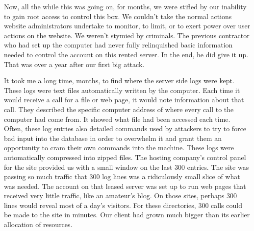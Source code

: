 Now, all the while this was going on, for months, we were stifled by our inability to gain root access to control this box.  We couldn't take the normal actions website administrators undertake to monitor, to limit, or to exert power over user actions on the website.  We weren't stymied by criminals.  The previous contractor who had set up the computer had never fully relinquished basic information needed to control the account on this rented server.  In the end, he did give it up.  That was over a year after our first big \gls{attack}.

It took me a long time, months, to find where the server side logs were kept.  These logs were text files automatically written by the computer.  Each time it would receive a call for a file or web page, it would note information about that call.  They described the specific computer address of where every call to the computer had come from.  It showed what file had been accessed each time.  Often, these log entries also detailed commands used by attackers to try to force bad input into the database in order to overwhelm it and grant them an opportunity to cram their own commands into the machine.  These logs were automatically compressed into zipped files.  The hosting company's control panel for the site provided us with a small window on the last 300 entries.  The site was passing so much traffic that 300 log lines was a ridiculously small slice of what was needed.  The account on that leased server was set up to run web pages that received very little traffic, like an amateur's blog.  On those sites, perhaps 300 lines would reveal most of a day's visitors.  For these directories, 300 calls could be made to the site in minutes.  Our client had grown much bigger than its earlier allocation of resources.

